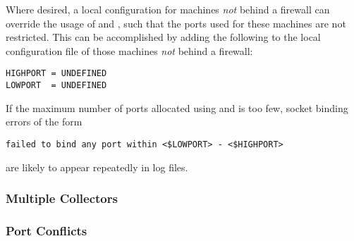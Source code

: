 Where desired, a local
configuration for machines \emph{not} behind a firewall
can override the usage of  and ,
such that the ports used for these machines are not restricted.
This can be accomplished by adding the following to the
local configuration file of those machines \emph{not}
behind a firewall:
\begin{verbatim}
HIGHPORT = UNDEFINED
LOWPORT  = UNDEFINED
\end{verbatim}


If the maximum number of ports allocated using 
 and 
is too few,
socket binding errors of the form
\footnotesize
\begin{verbatim}
failed to bind any port within <$LOWPORT> - <$HIGHPORT>
\end{verbatim}
\normalsize
are likely to appear repeatedly in log files.


\subsubsection{\label{sec:Ports-MultipleCollectors}Multiple Collectors}
\Todo


\subsubsection{\label{sec:Ports-Conflicts}Port Conflicts}
\Todo

